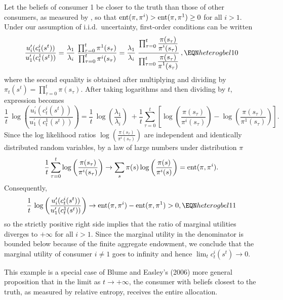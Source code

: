 Let the beliefs
of consumer 1 be closer to the truth than those of
other consumers, as measured by  , so that
${\rm ent}(\pi, \pi^i) > {\rm ent}(\pi, \pi^1) \geq 0$ for all
$i>1$.
Under our assumption of i.i.d.\ uncertainty, first-order
conditions  can be written
$$ {\frac{u_i^\prime(c^i_t(s^t))}{u_1^\prime(c^1_t(s^t))}}
 = {\frac{\lambda_1}{\lambda_i}} \;
   {\frac{\prod_{\tau=0}^t \pi^1(s_{\tau})}
        {\prod_{\tau=0}^t \pi^i(s_{\tau})}}
 = {\frac{\lambda_1}{\lambda_i}} \;
{\frac{\prod_{\tau=0}^t {\frac{\displaystyle \pi(s_{\tau})}
                            {\displaystyle \pi^i(s_{\tau})}}}
     {\prod_{\tau=0}^t {\frac{\displaystyle \pi(s_{\tau})}
                            {\displaystyle \pi^1(s_{\tau})}}}}\,,
                                                    \EQN heterogbel10
$$
where the second equality is obtained after multiplying and dividing
by $\pi_t(s^t)=\prod_{\tau=0}^t \pi(s_{\tau})$. After taking
logarithms and then dividing by $t$, expression 
becomes
$$ {\frac{1}{t}}\,
\log\left({\frac{u_i^\prime(c^i_t(s^t))}{u_1^\prime(c^1_t(s^t))}}\right)
 = {\frac{1}{t}}\, \log\left({\frac{\lambda_1}{\lambda_i}}\right) \; +
{\frac{1}{t}}\sum_{\tau=0}^t
\left[\log\left({\frac{\pi(s_{\tau})}{\pi^i(s_{\tau})}}\right)
- \log\left({\frac{\pi(s_{\tau})}{\pi^1(s_{\tau})}}\right)\right].
$$
Since the log likelihood ratios
$\log\left({\frac{\pi(s_{\tau})}{\pi^i(s_{\tau})}}\right)$ are
independent and identically distributed random variables, by
a law of large numbers under distribution $\pi$
$$ {\frac{1}{t}}\sum_{\tau=0}^t
\log\left({\frac{\pi(s_{\tau})}{\pi^i(s_{\tau})}}\right)
\rightarrow
\sum_s \pi(s) \log \left({\frac{\pi(s)}{\pi^i(s)}}\right)
= {\rm ent}(\pi, \pi^i).
$$
Consequently,
$$ {\frac{1}{t}}\,
\log\left({\frac{u_i^\prime(c^i_t(s^t))}{u_1^\prime(c^1_t(s^t))}}\right)
\rightarrow
{\rm ent}(\pi, \pi^i) - {\rm ent}(\pi, \pi^1) >0,
                                                    \EQN heterogbel11
$$
so the strictly positive right side implies that the ratio of marginal
utilities diverges to $+\infty$ for all $i > 1$. Since the marginal utility in the
denominator is bounded below because of the finite aggregate endowment,
we conclude that the marginal utility of consumer $i \neq 1$ goes to
infinity and hence $\lim_t c^i_t(s^t)\rightarrow 0$.

This example is a special case of
Blume and Easley's (2006) more general proposition that in the limit as $t \rightarrow +\infty$, the  consumer with beliefs closest to the truth, as measured by relative entropy, receives the entire allocation.
%
%
%



